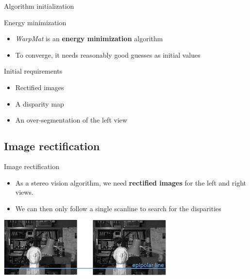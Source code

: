 \documentclass[12pt]{beamer}
\begin{document}
\begin{frame}{Algorithm initialization}
  \begin{block}{Energy minimization}
    \begin{itemize}
      \item \emph{WarpMat} is an \textbf{energy minimization} algorithm
      \item To converge, it needs reasonably good guesses as initial values
    \end{itemize}
  \end{block}

  \begin{block}{Initial requirements}
    \begin{itemize}
      \item Rectified images
      \item A disparity map
      \item An over-segmentation of the left view
    \end{itemize}
  \end{block}
\end{frame}

\subsection{Image rectification}

\begin{frame}{Image rectification}
  \begin{block}{}
    \begin{itemize}
      \item As a stereo vision algorithm, we need \textbf{rectified images} for the left and right views.
      \item We can then only follow a single scanline to search for the disparities
    \end{itemize}

  \end{block}
  \begin{center} \includegraphics[height=3cm]{../images/Rectify-Scanlines.png} \end{center}
\end{frame}
\end{document}
